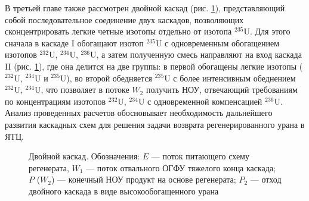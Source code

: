 В третьей главе также рассмотрен двойной каскад (рис. \ref{fig:double_ru_in3}), представляющий собой последовательное соединение двух каскадов, позволяющих сконцентрировать легкие четные изотопы отдельно от изотопа $^{235}$U. Для этого сначала в каскаде I обогащают изотоп $^{235}$U с одновременным обогащением изотопов $^{232}$U, $^{234}$U, $^{236}$U, а затем полученную смесь направляют на вход каскада II (рис. \ref{fig:double_ru_in3}), где она делится на две группы: в первой обогащены легкие изотопы ($^{232}$U, $^{234}$U и $^{235}$U), во второй обедняется $^{235}$U с более интенсивным обеднением $^{232}$U, $^{234}$U, что позволяет в потоке $W_2$ получить НОУ, отвечающий требованиям по концентрациям изотопов $^{232}$U, $^{234}$U с одновременной компенсацией $^{236}$U. Анализ проведенных расчетов обосновывает необходимость дальнейшего развития каскадных схем для решения задачи возврата регенерированного урана в ЯТЦ.

\begin{figure}[ht]
  \caption{Двойной каскад. Обозначения: $E$ --- поток питающего схему регенерата, $W_1$ --- поток отвального ОГФУ тяжелого конца каскада; $P$ ($W_2$) --- конечный НОУ продукт на основе регенерата; $P_2$ --- отход двойного каскада в виде высокообогащенного урана}\label{fig:double_ru_in3}
\end{figure}



